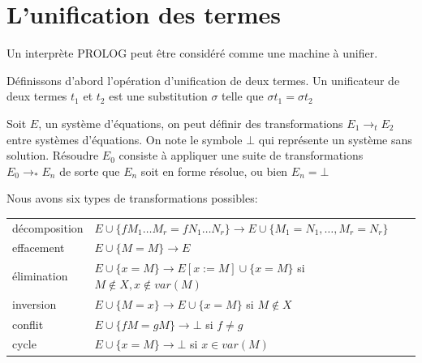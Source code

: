 \documentclass[11pt]{book}
\begin{document}
\section{L'unification des termes}
Un interprète PROLOG peut être considéré comme une machine à unifier.

Définissons d'abord l'opération d'unification de deux termes.
Un unificateur de deux termes $t_1$ et $t_2$ est une substitution $\sigma$ telle que $\sigma t_1 = \sigma t_2$

Soit $E$, un système d'équations, on peut définir des transformations $E_{1} \rightarrow _t   E_{2} $
entre systèmes d'équations. On note le symbole $\bot$ qui représente un système sans solution.
Résoudre $E_0$ consiste à appliquer une suite de transformations $E_{0} \rightarrow _*   E_{n} $ de sorte que
$E_{n}$ soit en forme résolue, ou bien $E_{n} = \bot$

Nous avons six types de transformations possibles: 


\begin{tabular}{ll}
décomposition & $E \cup \{ f M_1 \dots M_r = f N_1 \dots N_r \} \rightarrow   E \cup \{ M_1 = N_1 , \dots ,M_r = N_r \} $ \\ 
effacement & $E \cup \{ M=M \} \rightarrow   E $ \\ 
élimination & $E \cup \{ x=M \} \rightarrow  E[x:=M] \cup \{ x=M \}$  si $M \notin X, x \notin var(M)$\\ 
inversion & $E \cup \{ M=x \}  \rightarrow  E \cup \{ x=M \}$ si $M \notin X$ \\ 
conflit &  $E \cup \{ f M = g M\} \rightarrow   \bot $ si $ f \neq g $  \\ 
cycle & $E \cup \{ x=M \} \rightarrow  \bot $ si $x \in var(M)$ \\ 
\end{tabular}

\vspace{0.5cm}
\end{document}

